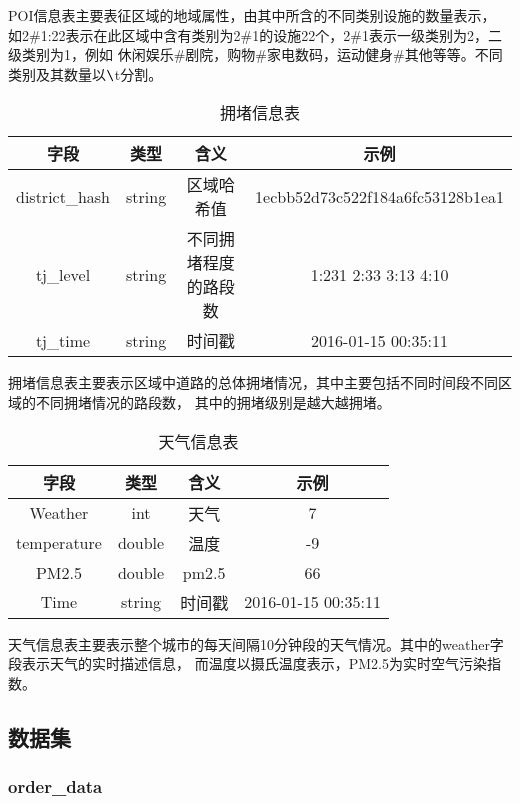 \documentclass[hyperref,UTF8]{ctexart}
\theoremstyle{definition}
\theoremstyle{remark}
\numberwithin{equation}{subsection}
\begin{document}
	POI信息表主要表征区域的地域属性，由其中所含的不同类别设施的数量表示，
如2\#1:22表示在此区域中含有类别为2\#1的设施22个，2\#1表示一级类别为2，二级类别为1，例如
休闲娱乐\#剧院，购物\#家电数码，运动健身\#其他等等。不同类别及其数量以$\verb|\|$t分割。
	
	\begin{table}[H]
    \centering
	\caption{拥堵信息表}
	\begin{tabular}{|c|c|c|c|}
	\hline
	字段	&	类型	&	含义	&	示例		\\
	\hline
	district\_hash & string & 区域哈希值 & 1ecbb52d73c522f184a6fc53128b1ea1		\\
	tj\_level & string & 不同拥堵程度的路段数 & 1:231 2:33 3:13 4:10			\\
	tj\_time & string & 时间戳 & 2016-01-15 00:35:11							\\
	\hline
	\end{tabular}
	\end{table}
	
	拥堵信息表主要表示区域中道路的总体拥堵情况，其中主要包括不同时间段不同区域的不同拥堵情况的路段数，
其中的拥堵级别是越大越拥堵。

	\begin{table}[H]
    \centering
	\caption{天气信息表}
	\begin{tabular}{|c|c|c|c|}
	\hline
	字段	&	类型	&	含义	&	示例		\\
	\hline
	Weather & int & 天气 & 7	\\
	temperature & double & 温度 & -9	\\
	PM2.5 & double & pm2.5 & 66	\\
	Time & string & 时间戳 & 2016-01-15 00:35:11	\\
	\hline
	\end{tabular}
	\end{table}
	
	天气信息表主要表示整个城市的每天间隔10分钟段的天气情况。其中的weather字段表示天气的实时描述信息，
而温度以摄氏温度表示，PM2.5为实时空气污染指数。

	
\subsection{数据集}	
\label{sec:data_set}

\subsubsection{order\_data}
\end{document}
